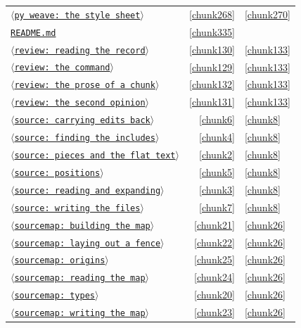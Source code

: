 \documentclass[10pt,a4paper]{article}
\newcounter{chunk}
\newcommand{\chunkname}[1]{\ensuremath{\langle}\texttt{#1}\ensuremath{\rangle}}
\begin{document}
\begin{longtable}{@{}p{}rp{}@{}}
\hyperref[chunk268]{\chunkname{py weave: the style sheet}} & \ref*{chunk268} & \hyperref[chunk270]{\ref*{chunk270}} \\
\hyperref[chunk335]{\texttt{README.\allowbreak{}md}} & \ref*{chunk335} &  \\
\hyperref[chunk130]{\chunkname{review: reading the record}} & \ref*{chunk130} & \hyperref[chunk133]{\ref*{chunk133}} \\
\hyperref[chunk129]{\chunkname{review: the command}} & \ref*{chunk129} & \hyperref[chunk133]{\ref*{chunk133}} \\
\hyperref[chunk132]{\chunkname{review: the prose of a chunk}} & \ref*{chunk132} & \hyperref[chunk133]{\ref*{chunk133}} \\
\hyperref[chunk131]{\chunkname{review: the second opinion}} & \ref*{chunk131} & \hyperref[chunk133]{\ref*{chunk133}} \\
\hyperref[chunk6]{\chunkname{source: carrying edits back}} & \ref*{chunk6} & \hyperref[chunk8]{\ref*{chunk8}} \\
\hyperref[chunk4]{\chunkname{source: finding the includes}} & \ref*{chunk4} & \hyperref[chunk8]{\ref*{chunk8}} \\
\hyperref[chunk2]{\chunkname{source: pieces and the flat text}} & \ref*{chunk2} & \hyperref[chunk8]{\ref*{chunk8}} \\
\hyperref[chunk5]{\chunkname{source: positions}} & \ref*{chunk5} & \hyperref[chunk8]{\ref*{chunk8}} \\
\hyperref[chunk3]{\chunkname{source: reading and expanding}} & \ref*{chunk3} & \hyperref[chunk8]{\ref*{chunk8}} \\
\hyperref[chunk7]{\chunkname{source: writing the files}} & \ref*{chunk7} & \hyperref[chunk8]{\ref*{chunk8}} \\
\hyperref[chunk21]{\chunkname{sourcemap: building the map}} & \ref*{chunk21} & \hyperref[chunk26]{\ref*{chunk26}} \\
\hyperref[chunk22]{\chunkname{sourcemap: laying out a fence}} & \ref*{chunk22} & \hyperref[chunk26]{\ref*{chunk26}} \\
\hyperref[chunk25]{\chunkname{sourcemap: origins}} & \ref*{chunk25} & \hyperref[chunk26]{\ref*{chunk26}} \\
\hyperref[chunk24]{\chunkname{sourcemap: reading the map}} & \ref*{chunk24} & \hyperref[chunk26]{\ref*{chunk26}} \\
\hyperref[chunk20]{\chunkname{sourcemap: types}} & \ref*{chunk20} & \hyperref[chunk26]{\ref*{chunk26}} \\
\hyperref[chunk23]{\chunkname{sourcemap: writing the map}} & \ref*{chunk23} & \hyperref[chunk26]{\ref*{chunk26}} \\

\end{longtable}
\end{document}
